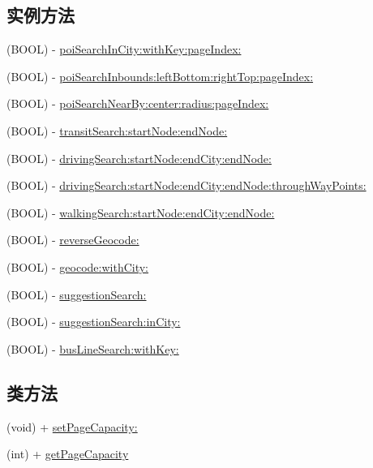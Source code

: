 \subsection*{实例方法}
\begin{DoxyCompactItemize}
\item 
(B\-O\-O\-L) -\/ \hyperlink{interface_b_m_k_search_a3d4be019a638b79bff6c95081e624b24}{poi\-Search\-In\-City\-:with\-Key\-:page\-Index\-:}
\item 
(B\-O\-O\-L) -\/ \hyperlink{interface_b_m_k_search_a905ca1d5f5b829d9759903234b359657}{poi\-Search\-Inbounds\-:left\-Bottom\-:right\-Top\-:page\-Index\-:}
\item 
(B\-O\-O\-L) -\/ \hyperlink{interface_b_m_k_search_ad57823f0c67cfa45180b69299b546351}{poi\-Search\-Near\-By\-:center\-:radius\-:page\-Index\-:}
\item 
(B\-O\-O\-L) -\/ \hyperlink{interface_b_m_k_search_a2c2eacd43a31175dfcc1d4c6d89e0498}{transit\-Search\-:start\-Node\-:end\-Node\-:}
\item 
(B\-O\-O\-L) -\/ \hyperlink{interface_b_m_k_search_a20e8105eea18c931b4f7d5f75cefbf09}{driving\-Search\-:start\-Node\-:end\-City\-:end\-Node\-:}
\item 
(B\-O\-O\-L) -\/ \hyperlink{interface_b_m_k_search_acc6e736e62cdafd5a1daa94d75071642}{driving\-Search\-:start\-Node\-:end\-City\-:end\-Node\-:through\-Way\-Points\-:}
\item 
(B\-O\-O\-L) -\/ \hyperlink{interface_b_m_k_search_aa2a9b0f69520e4e17ff9504d10e77f57}{walking\-Search\-:start\-Node\-:end\-City\-:end\-Node\-:}
\item 
(B\-O\-O\-L) -\/ \hyperlink{interface_b_m_k_search_ae5169b6362dda612ffd1f1b5f9df6137}{reverse\-Geocode\-:}
\item 
(B\-O\-O\-L) -\/ \hyperlink{interface_b_m_k_search_a5bd9e45d6d8042585428d5bdde0b584b}{geocode\-:with\-City\-:}
\item 
(B\-O\-O\-L) -\/ \hyperlink{interface_b_m_k_search_a8d4b04f2d17b67229b59bf6224bdee7a}{suggestion\-Search\-:}
\item 
(B\-O\-O\-L) -\/ \hyperlink{interface_b_m_k_search_a4d0b7ec9e07dd5493e14de39edf852d0}{suggestion\-Search\-:in\-City\-:}
\item 
(B\-O\-O\-L) -\/ \hyperlink{interface_b_m_k_search_ac6256527dd532f554d02410cef13caf8}{bus\-Line\-Search\-:with\-Key\-:}
\end{DoxyCompactItemize}
\subsection*{类方法}
\begin{DoxyCompactItemize}
\item 
(void) + \hyperlink{interface_b_m_k_search_a18442a7afac76b21535d175189b7d2ec}{set\-Page\-Capacity\-:}
\item 
(int) + \hyperlink{interface_b_m_k_search_a21e67fb54e22bfdca495490f3bfa731d}{get\-Page\-Capacity}
\end{DoxyCompactItemize}
